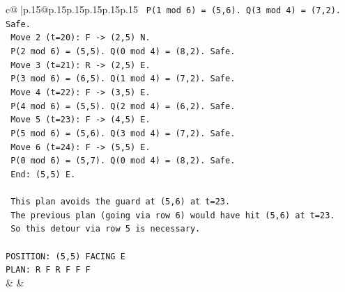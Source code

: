 \documentclass{article}
\begin{document}
{\begin{supertabular}{c@{$\;$}|p{.15\linewidth}@{}p{.15\linewidth}p{.15\linewidth}p{.15\linewidth}p{.15\linewidth}p{.15\linewidth}}
{{{\texttt{      P(1 mod 6) = (5,6). Q(3 mod 4) = (7,2). Safe.} \\
\texttt{    Move 2 (t=20): F {-}> (2,5) N.} \\
\texttt{      P(2 mod 6) = (5,5). Q(0 mod 4) = (8,2). Safe.} \\
\texttt{    Move 3 (t=21): R {-}> (2,5) E.} \\
\texttt{      P(3 mod 6) = (6,5). Q(1 mod 4) = (7,2). Safe.} \\
\texttt{    Move 4 (t=22): F {-}> (3,5) E.} \\
\texttt{      P(4 mod 6) = (5,5). Q(2 mod 4) = (6,2). Safe.} \\
\texttt{    Move 5 (t=23): F {-}> (4,5) E.} \\
\texttt{      P(5 mod 6) = (5,6). Q(3 mod 4) = (7,2). Safe.} \\
\texttt{    Move 6 (t=24): F {-}> (5,5) E.} \\
\texttt{      P(0 mod 6) = (5,7). Q(0 mod 4) = (8,2). Safe.} \\
\texttt{    End: (5,5) E.} \\
\\ 
\texttt{    This plan avoids the guard at (5,6) at t=23.} \\
\texttt{    The previous plan (going via row 6) would have hit (5,6) at t=23.} \\
\texttt{    So this detour via row 5 is necessary.} \\
\\ 
\texttt{POSITION: (5,5) FACING E} \\
\texttt{PLAN: R F R F F F} \\
            }
        }
    }
    & & \\ \\


\end{supertabular}}
\end{document}
